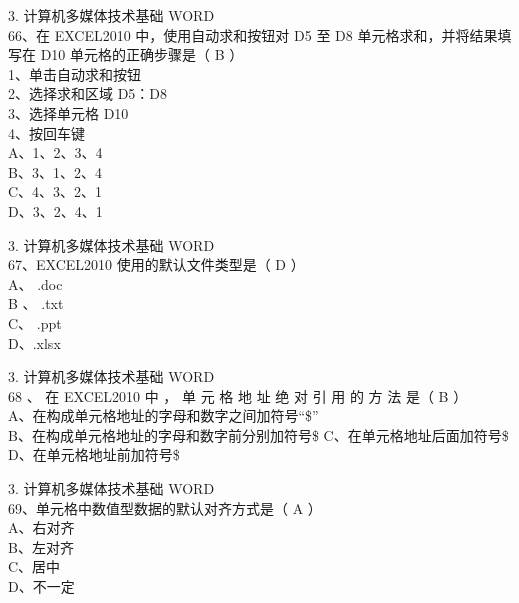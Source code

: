 \documentclass[aspectratio=169]{beamer}
\begin{document}
\begin{frame}[t]{3. 计算机多媒体技术基础} \vspace{20pt}
    WORD\\
66、在 EXCEL2010 中，使用自动求和按钮对 D5 至 D8 单元格求和，并将结果填写在 D10 单元格的正确步骤是（ B ）\\
1、单击自动求和按钮\\
2、选择求和区域 D5：D8\\
3、选择单元格 D10 \\
4、按回车键\\
A、1、2、3、4\\
B、3、1、2、4\\
C、4、3、2、1\\
D、3、2、4、1\\
\end{frame}




\begin{frame}[t]{3. 计算机多媒体技术基础} \vspace{20pt}
    WORD\\

67、EXCEL2010 使用的默认文件类型是（ D ）\\
A、 .doc\\ B 、 .txt\\ C、 .ppt\\
D、.xlsx\\
\end{frame}

\begin{frame}[t]{3. 计算机多媒体技术基础} \vspace{20pt}
    WORD\\
    68 、 在 EXCEL2010 中 ， 单 元 格 地 址 绝 对 引 用 的 方 法 是（ B ）\\
    A、在构成单元格地址的字母和数字之间加符号“\$”\\
    B、在构成单元格地址的字母和数字前分别加符号\$
    C、在单元格地址后面加符号\$
    D、在单元格地址前加符号\$
\end{frame}




\begin{frame}[t]{3. 计算机多媒体技术基础} \vspace{20pt}
    WORD\\

69、单元格中数值型数据的默认对齐方式是（ A ）\\
A、右对齐\\ B、左对齐\\ C、居中\\
D、不一定\\
\end{frame}
\end{document}
